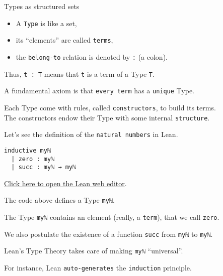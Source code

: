 \documentclass{beamer}
\begin{document}
\begin{frame}[fragile]{Types as structured sets}

\vspace{10pt}
\vspace{-13pt}
\begin{itemize}
\setlength\itemsep{-12pt}
\item
  A {\color{violet}\verb`Type`} is like a set,
\item
  its ``elements'' are called {\color{violet}\verb`terms`},
\item
  the {\color{violet}\verb`belong-to`} relation is denoted by {\color{violet}\verb`:`} (a colon).
\end{itemize}

Thus, {\color{violet}\verb`t : T`} means that {\color{violet}\verb`t`} is a term of a Type {\color{violet}\verb`T`}.

A fundamental axiom is that {\color{violet}\verb`every term`} has a {\color{violet}\verb`unique`} Type.

Each Type come with rules, called {\color{violet}\verb`constructors`}, to build its terms.
\\
The constructors endow their Type with some internal {\color{violet}\verb`structure`}.

Let's see the definition of the {\color{violet}\verb`natural numbers`} in Lean.
\end{frame}

\begin{frame}[fragile]

\begin{verbatim}
inductive myℕ
  | zero : myℕ
  | succ : myℕ → myℕ
\end{verbatim}
\vspace{-17pt}
{\small{\href{https://leanprover-community.github.io/lean-web-editor/#code=inductive%20my%E2%84%95%0A%20%20%7C%20zero%20%3A%20my%E2%84%95%0A%20%20%7C%20succ%20%3A%20my%E2%84%95%20%E2%86%92%20my%E2%84%95%0A%0A%23print%20prefix%20my%E2%84%95%0A}{Click here to open the Lean web editor}.}}

The code above defines a Type {\color{violet}\verb`myℕ`}.

The Type {\color{violet}\verb`myℕ`} contains an element (really, a {\color{violet}\verb`term`}), that we call {\color{violet}\verb`zero`}.

We also postulate the existence of a function {\color{violet}\verb`succ`} from {\color{violet}\verb`myℕ`} to {\color{violet}\verb`myℕ`}.

Lean's Type Theory takes care of making {\color{violet}\verb`myℕ`} ``universal''.

For instance, Lean {\color{violet}\verb`auto-generates`} the {\color{violet}\verb`induction`} principle.
\end{frame}
\end{document}
